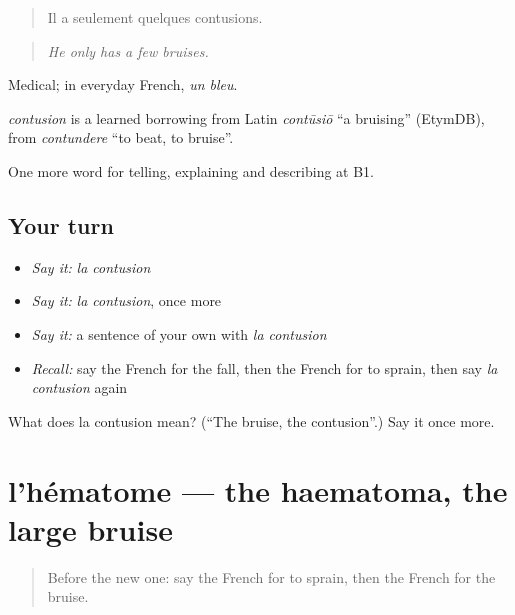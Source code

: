 \begin{quote}
Il a seulement quelques contusions.
\end{quote}

\begin{quote}
\emph{He only has a few bruises.}
\end{quote}

Medical; in everyday French, \emph{un bleu}.

\begin{cousinweb}
\emph{contusion} is a learned borrowing from Latin \emph{contūsiō} \textquotedblleft{}a bruising\textquotedblright{} (EtymDB), from \emph{contundere} \textquotedblleft{}to beat, to bruise\textquotedblright{}.
\end{cousinweb}

\begin{grammarlens}[title={What you've built}]
One more word for telling, explaining and describing at B1.
\end{grammarlens}

\subsection*{Your turn}
\begin{itemize}
\raggedright
  \item \emph{Say it:} \emph{la contusion}
  \item \emph{Say it:} \emph{la contusion}, once more
  \item \emph{Say it:} a sentence of your own with \emph{la contusion}
  \item \emph{Recall:} say the French for the fall, then the French for to sprain, then say \emph{la contusion} again
\end{itemize}

\begin{tcolorbox}[breakable,colback=teal!4,colframe=teal!35!black,title={Before you move on}]
What does la contusion mean? (\textquotedblleft{}The bruise, the contusion\textquotedblright{}.) Say it once more.
\end{tcolorbox}
\section[l'hématome]{l'hématome — the haematoma, the large bruise}

\label{lesson:FR-C299-hematome}



\begin{quote}
Before the new one: say the French for to sprain, then the French for the bruise.
\end{quote}

